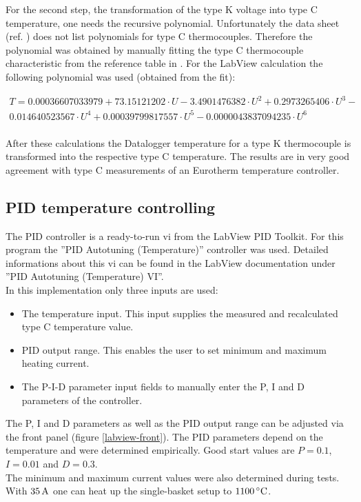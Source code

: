 \documentclass[parskip,12pt,headsepline,a4paper] {scrbook}
\begin{document}
For the second step, the transformation of the type K voltage into type C temperature, one needs the recursive polynomial. Unfortunately the data sheet (ref. \cite{omega-polynomials}) does not list polynomials for type C thermocouples. Therefore the polynomial was obtained by manually fitting the type C thermocouple characteristic from the reference table in \cite{ref-typec}. For the LabView calculation the following polynomial was used (obtained from the fit):

\begin{multline}  \label{fit-polynomial}
T = 0.00036607033979 + 73.15121202 \cdot U - 3.4901476382 \cdot U^2 + 0.2973265406 \cdot U^3 - \\
    0.014640523567 \cdot U^4 + 0.00039799817557 \cdot U^5 - 0.0000043837094235 \cdot U^6 \\
\end{multline}

After these calculations the Datalogger temperature for a type K thermocouple is transformed into the respective type C temperature. The results are in very good agreement with type C measurements of an Eurotherm temperature controller.

\subsection{PID temperature controlling}
\vspace{-1\baselineskip}
The PID controller is a ready-to-run vi from the LabView PID Toolkit. For this program the ''PID Autotuning (Temperature)'' controller was used. Detailed informations about this vi can be found in the LabView documentation under ''PID Autotuning (Temperature) VI''. \\
In this implementation only three inputs are used:

\begin{itemize}
\item The temperature input. This input supplies the measured and recalculated type C temperature value.
\item PID output range. This enables the user to set minimum and maximum heating current.
\item The P-I-D parameter input fields to manually enter the P, I and D parameters of the controller.
\end{itemize}

The P, I and D parameters as well as the PID output range can be adjusted via the front panel (figure \ref{labview-front}). The PID parameters depend on the temperature and were determined empirically. Good start values are $P = 0.1$, $I = 0.01$ and $D = 0.3$. \\
The minimum and maximum current values were also determined during tests. With $\unit[35]{A}$ one can heat up the single-basket setup to $\unit[1100]{^\circ C}$.
\end{document}
